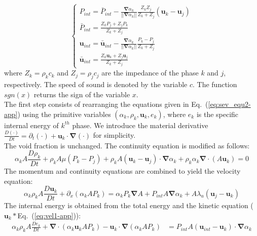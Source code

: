 \documentclass[preprint,10pt]{elsarticle}
\renewcommand{\div}{\mbold{\nabla}\! \cdot \!}
\newcommand{\grad}{\mbold{\nabla}}
\newcommand{\mbold}[1]{\boldsymbol#1}
\newcommand{\eqt}[1]{Eq.~(\ref{#1})}                     %
\begin{document}
\begin{appendices}
\begin{equation}
\label{eq:sev_equ2-app}
\left\{
\begin{array}{lll}
P_{int} = \bar{P}_{int} - \frac{\grad \alpha_k}{|| \grad \alpha_k ||} \frac{Z_k Z_j}{Z_k + Z_j} \left( \mbold u_k-\mbold u_j \right) \\
\bar{P}_{int} = \frac{Z_k P_j + Z_j P_k}{Z_k + Z_j} \\
\mbold u_{int} = \bar{\mbold u}_{int} - \frac{\grad \alpha_k}{|| \grad \alpha_k ||} \frac{P_k - P_j}{Z_k + Z_j} \\
\bar{\mbold u}_{int} = \frac{Z_k \mbold u _k + Z_j \mbold u_j}{Z_k + Z_j}
\end{array}
\right.
\end{equation}
where $Z_k = \rho_k c_k$ and $Z_j = \rho_j c_j$ are the impedance of the phase $k$ and $j$, respectively. The speed of sound is denoted by the variable $c$. The function $sgn(x)$ returns the sign of the variable $x$.\\
The first step consists of rearranging the equations given in \eqt{eq:sev_equ2-app} using the primitive variables $(\alpha_k, \rho_k, \mbold u_k, e_k)$, where $e_k$ is the specific internal energy of $k^{th}$ phase. We introduce the material derivative $\frac{D (\cdot)}{Dt} = \partial_t (\cdot) + \mbold u_k \cdot \grad (\cdot)$ for simplicity. \\
The void fraction is unchanged. The continuity equation is modified as follows:
\begin{equation}
\label{eq:cont1-app}
\alpha_k A \frac{D \rho_k}{Dt} + \rho_k A \mu \left( P_k-P_j \right) + \rho_k A \left( \mbold u_k-\mbold u_j \right) \cdot \grad \alpha_k + \rho_k \alpha_k \div \left( A \mbold u_k \right) = 0
\end{equation}
The momentum and continuity equations are combined to yield the velocity equation:
\begin{equation}
\label{eq:vel1-app}
\alpha_k \rho_k A \frac{D\mbold u_k}{Dt} + \partial_x \left( \alpha_k A P_k \right) = \alpha_k P_k \grad A + P_{int} A \grad \alpha_k + A \lambda_u \left( \mbold u_j-\mbold u_k \right)
\end{equation}
The internal energy is obtained from the total energy and the kinetic equation ($\mbold u_k * $\eqt{eq:vel1-app}):
\begin{align}\label{eq:internal1}
\alpha_k \rho_k A \frac{D e_k}{Dt} + \div\left( \alpha_k \mbold u_k A P_k \right) - \mbold u_k \cdot \grad \left( \alpha_k A P_k \right) &= P_{int} A \left(\mbold u_{int}-\mbold u_k \right) \cdot \grad \alpha_k \nonumber \\

\end{align}
\end{appendices}
\end{document}
